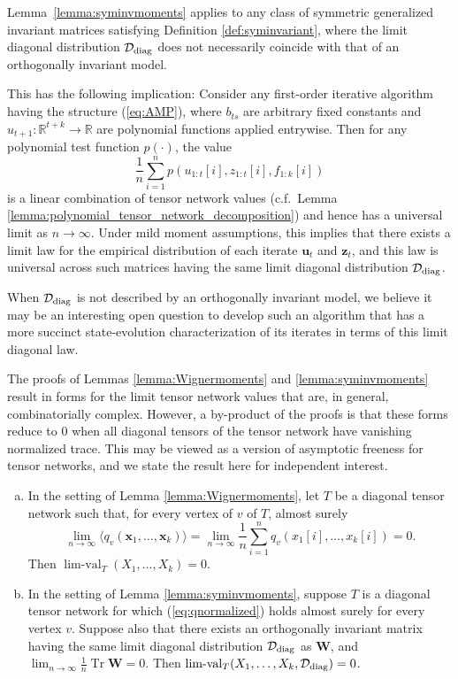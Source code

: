 \documentclass[10pt,reqno]{amsart}
\def\u{\mathbf{u}}
\def\x{\mathbf{x}}
\def\z{\mathbf{z}}
\def\W{\mathbf{W}}
\def\R{\mathbb{R}}
\def\limval{\operatorname{lim-val}}
\def\bW{{\mathbf{W}}}
\def\Tr{\operatorname{Tr}}
\newcommand{\tdiag}{\mathrm{diag}}
\begin{document}
\begin{remark}\label{remark:sym_tn_universality}
Lemma~\ref{lemma:syminvmoments} applies to any class of 
symmetric generalized invariant matrices satisfying Definition
\ref{def:syminvariant}, where the limit diagonal distribution
$\cD_\tdiag$ does not necessarily coincide with that of an orthogonally
invariant model.

This has the following implication: Consider any first-order iterative algorithm
having the structure (\ref{eq:AMP}), where $b_{ts}$ are arbitrary
fixed constants and $u_{t+1}:\R^{t+k} \to \R$ are polynomial functions applied
entrywise. Then for any polynomial test function $p(\cdot)$, the value
\[\frac{1}{n}\sum_{i=1}^n p(u_{1:t}[i],z_{1:t}[i],f_{1:k}[i])\]
is a linear combination of tensor network values (c.f.\ Lemma
\ref{lemma:polynomial_tensor_network_decomposition}) and hence has a universal
limit as $n \to \infty$. Under mild moment assumptions, this implies that
there exists a
limit law for the empirical distribution of each iterate $\u_t$ and $\z_t$,
and this
law is universal across such matrices having the same limit diagonal
distribution $\cD_\tdiag$.

When $\cD_\tdiag$ is not described by an orthogonally invariant model, we
believe it may be an interesting open question to develop such an
algorithm that has a more succinct state-evolution
characterization of its iterates in terms of this limit diagonal law.
\end{remark}

The proofs of Lemmas \ref{lemma:Wignermoments} and \ref{lemma:syminvmoments}
result in forms for the limit tensor network values that are, in general,
combinatorially complex. However, a by-product of the proofs is that these forms
reduce to 0 when all diagonal
tensors of the tensor network have vanishing normalized trace.
This may be viewed as a version of asymptotic freeness for tensor networks, and 
we state the result here for independent interest.

\begin{proposition}\label{prop:freeness}
\begin{enumerate}[(a)]
\item In the setting of Lemma \ref{lemma:Wignermoments}, let $T$ be a diagonal
tensor network such that, for every vertex of $v$ of $T$, almost surely
\begin{equation}\label{eq:qnormalized}
\lim_{n \to \infty} \langle q_v(\x_1,\ldots,\x_k) \rangle
=\lim_{n \to \infty} \frac{1}{n}\sum_{i=1}^n q_v(x_1[i],\ldots,x_k[i])=0.
\end{equation}
Then $\limval_T(X_1,\ldots,X_k)=0$.
\item In the setting of Lemma \ref{lemma:syminvmoments}, suppose $T$ is a
diagonal tensor network for which (\ref{eq:qnormalized}) holds almost surely
for every vertex $v$.
Suppose also that there exists an orthogonally invariant matrix having the same 
limit diagonal distribution $\cD_\tdiag$ as $\bW$, and 
$\lim_{n \to \infty} \frac{1}{n} \Tr \W=0$.
Then $\limval_T(X_1,\ldots,X_k,\cD_\tdiag)=0$.
\end{enumerate}
\end{proposition}
\end{document}
